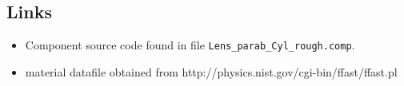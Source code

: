 \subsection*{Links}
\begin{itemize}
  \item Component source code found in file \texttt{Lens\_parab\_Cyl\_rough.comp}.
  \item material datafile obtained from http://physics.nist.gov/cgi-bin/ffast/ffast.pl
\end{itemize}
